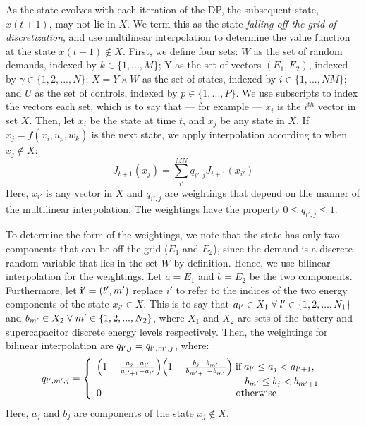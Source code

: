 \documentclass[conference]{IEEEtran}
\begin{document}
As the state evolves with each iteration of the DP, the subsequent state, $x(t+1)$, may not lie in $X$. We term this as the state \textit{falling off the grid of discretization}, and use multilinear interpolation to determine the value function at the state $x(t+1)\not\in X$. First, we define four sets: $W$ as the set of random demands, indexed by $k\in\{1,...,M\}$; Y as the set of vectors $(E_{1},E_{2})$, indexed by $\gamma \in\{1,2,...,N\}$; $X=Y\times W$ as the set of states, indexed by $i\in\{1,...,NM\}$; and $U$ as the set of controls, indexed by $p\in\{1,...,P\}$. We use subscripts to index the vectors each set, which is to say that --- for example --- $x_{i}$ is the $i^{th}$ vector in set $X$. Then, let $x_{i}$ be the state at time $t$, and $x_{j}$ be any state in $X$. If $x_{j}=f(x_{i},u_{p},w_{k})$ is the next state, we apply interpolation according to \cite{715376} when $x_{j}\not\in X$:
\begin{equation} \label{eq:InterpMap}
	J_{t+1}(x_{j})=\sum_{i'}^{MN}q_{i',j}J_{t+1}(x_{i'})
\end{equation} Here, $x_{i'}$ is any vector in $X$ and $q_{i',j}$ are weightings that depend on the manner of the multilinear interpolation. The weightings have the property $0\leq q_{i',j}\leq 1$.

To determine the form of the weightings, we note that the state has only two components that can be off the grid ($E_{1}$ and $E_{2}$), since the demand is a discrete random variable that lies in the set $W$ by definition. Hence, we use bilinear interpolation for the weightings. Let $a=E_{1}$ and $b=E_{2}$ be the two components. Furthermore, let $\bold{i'}=(l',m')$ replace $i'$ to refer to the indices of the two energy components of the state $x_{i'}\in X$. This is to say that $a_{l'}\in X_{1}\hspace{0.1cm}\forall\hspace{0.1cm}l'\in\{1,2,..., N_{1}\}$ and $b_{m'}\in X_{2}\hspace{0.1cm}\forall\hspace{0.1cm} m'\in\{1,2,..., N_{2}\}$, where $X_{1}$ and $X_{2}$ are sets of the battery and supercapacitor discrete energy levels respectively. Then, the weightings for bilinear interpolation are $q_{\bold{i'},j}=q_{l',m',j}$, where:
\begin{displaymath}q_{l',m',j}=
\left\{
\begin{array}{l}
\Big(1-\frac{a_{j}-a_{l'}}{a_{l'+1}-a_{l'}}\Big)\Big(1-\frac{b_{j}-b_{m'}}{b_{m'+1}-b_{m'}}\Big)\hspace{0.1cm} \text{if} \hspace{0.1cm} a_{l'}\leq a_{j}< a_{l'+1},\\ \hspace{5.3cm}b_{m'}\leq b_{j}< b_{m'+1}\\
0		   \hspace{4.8cm} \text{otherwise}
\end{array}
\right.
\end{displaymath} Here, $a_{j}$ and $b_{j}$ are components of the state $x_{j}\not\in X$.
\end{document}
